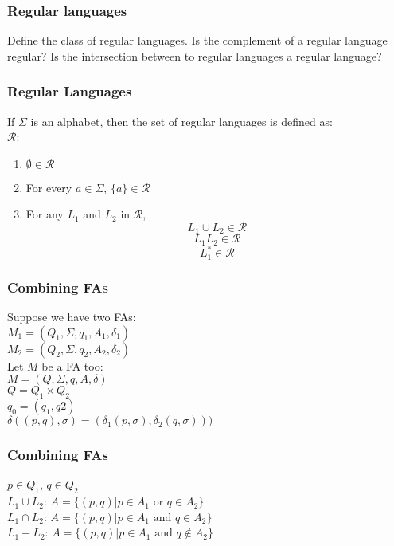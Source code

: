 

\begin{frame}
    \frametitle{Regular languages}
    Define the class of regular languages. Is the complement of a regular
    language regular? Is the intersection between to regular languages a
    regular language?
\end{frame}

\begin{frame}
    \frametitle{Regular Languages}
    If $\Sigma$ is an alphabet, then the set of regular languages is defined
    as:\\
    $\mathcal{R}$:
    \begin{enumerate}
        \item $\emptyset \in \mathcal{R}$
        \item For every $a \in \Sigma$, $\{a\} \in \mathcal{R}$
        \item For any $L_1$ and $L_2$ in $\mathcal{R}$,
            \[L_1 \cup L_2 \in \mathcal{R}\]
            \[L_1 L_2 \in \mathcal{R}\]
            \[L_1^\ast \in \mathcal{R}\]
    \end{enumerate}
\end{frame}

\begin{frame}
    \frametitle{Combining FAs}
    Suppose we have two FAs:\\
    $M_1 = (Q_1, \Sigma, q_1, A_1, \delta_1)$\\
    $M_2 = (Q_2, \Sigma, q_2, A_2, \delta_2)$\\
    \pause
    \vspace{10 pt}
    Let $M$ be a FA too:\\
    $M = (Q, \Sigma, q, A, \delta)$\\

    \pause
    \vspace{10 pt}
    $Q = Q_1 \times Q_2$\\
    $q_0 = (q_1, q2)$\\
    $\delta((p, q), \sigma) = (\delta_1(p, \sigma), \delta_2(q, \sigma)))$
\end{frame}

\begin{frame}
    \frametitle{Combining FAs}
    $p \in Q_1$, $q \in Q_2$\\
    \vspace{10 pt}
    $L_1 \cup L_2$: $A = \{(p, q) | p \in A_1 \text{ or } q \in A_2\}$\\
    \vspace{4 pt}
    $L_1 \cap L_2$: $A = \{(p, q) | p \in A_1 \text{ and } q \in A_2\}$\\
    \vspace{4 pt}
    $L_1 - L_2$: $A = \{(p, q) | p \in A_1 \text{ and } q \not\in A_2\}$\\
\end{frame}


